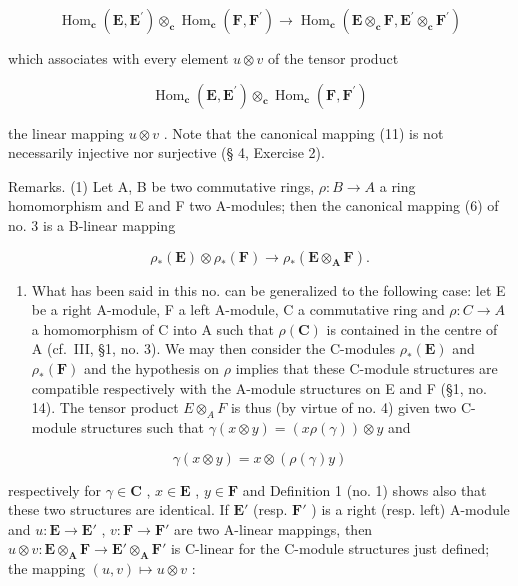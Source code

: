 \[
\operatorname{Hom} _ {\mathbf {c}} (\mathbf {E}, \mathbf {E} ^ {\prime}) \otimes_ {\mathbf {c}} \operatorname{Hom} _ {\mathbf {c}} (\mathbf {F}, \mathbf {F} ^ {\prime}) \to \operatorname{Hom} _ {\mathbf {c}} (\mathbf {E} \otimes_ {\mathbf {c}} \mathbf {F}, \mathbf {E} ^ {\prime} \otimes_ {\mathbf {c}} \mathbf {F} ^ {\prime})\tag{11}
\]

which associates with every element \(u \otimes v\) of the tensor product

\[
\operatorname{Hom} _ {\mathbf {c}} (\mathbf {E}, \mathbf {E} ^ {\prime}) \otimes_ {\mathbf {c}} \operatorname{Hom} _ {\mathbf {c}} (\mathbf {F}, \mathbf {F} ^ {\prime})
\]

the linear mapping \(u \otimes v\) . Note that the canonical mapping (11) is not necessarily injective nor surjective (§ 4, Exercise 2).

Remarks. (1) Let A, B be two commutative rings, \(\rho:B\to A\) a ring homomorphism and E and F two A-modules; then the canonical mapping (6) of no. 3 is a B-linear mapping

\[
\rho_ {*} (\mathbf {E}) \otimes \rho_ {*} (\mathbf {F}) \rightarrow \rho_ {*} (\mathbf {E} \otimes_ {\mathbf {A}} \mathbf {F}).\tag{12}
\]

\begin{enumerate}
\def\labelenumi{(\arabic{enumi})}
\setcounter{enumi}{1}
\tightlist
\item
  What has been said in this no. can be generalized to the following case: let E be a right A-module, F a left A-module, C a commutative ring and \(\rho:C\to A\) a homomorphism of C into A such that \(\rho(\mathbf{C})\) is contained in the centre of A (cf.~III, §1, no. 3). We may then consider the C-modules \(\rho_{*}(\mathbf{E})\) and \(\rho_{*}(\mathbf{F})\) and the hypothesis on \(\rho\) implies that these C-module structures are compatible respectively with the A-module structures on E and F (§1, no. 14). The tensor product \(E\otimes_{A}F\) is thus (by virtue of no. 4) given two C-module structures such that \(\gamma(x\otimes y)=(x\rho(\gamma))\otimes y\) and
\end{enumerate}

\[
\gamma (x \otimes y) = x \otimes (\rho (\gamma) y)
\]

respectively for \(\gamma\in\mathbf{C}\) , \(x\in\mathbf{E}\) , \(y\in\mathbf{F}\) and Definition 1 (no. 1) shows also that these two structures are identical. If \(\mathbf{E}'\) (resp. \(\mathbf{F}'\) ) is a right (resp. left) A-module and \(u:\mathbf{E}\to\mathbf{E}'\) , \(v:\mathbf{F}\to\mathbf{F}'\) are two A-linear mappings, then \(u\otimes v:\mathbf{E}\otimes_{\mathbf{A}}\mathbf{F}\to\mathbf{E}'\otimes_{\mathbf{A}}\mathbf{F}'\) is C-linear for the C-module structures just defined; the mapping \((u,v)\mapsto u\otimes v\) :


